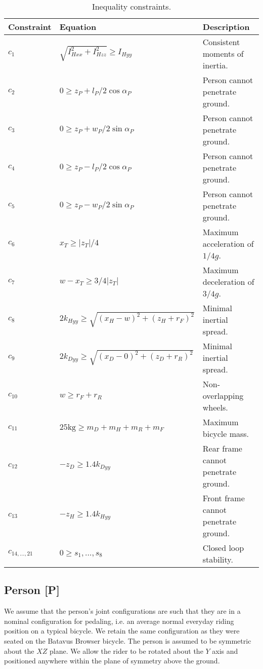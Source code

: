\documentclass{bmd2019p}
\begin{document}
\begin{table}
  \caption{Inequality constraints.}
  \label{tab:inequality-constraints}
  \centering
  \begin{tabular}{lll}
    \toprule
    Constraint & Equation & Description \\
    \midrule
    $c_1$    & $\sqrt{I_{Hxx}^2+I_{Hzz}^2} \geq I_{Hyy}$           & Consistent moments of inertia. \\
    $c_2$    & $0 \geq z_P + l_P/2 \cos{\alpha_P}$                 & Person cannot penetrate ground. \\
    $c_3$    & $0 \geq z_P + w_P/2 \sin{\alpha_P}$                 & Person cannot penetrate ground. \\
    $c_4$    & $0 \geq z_P - l_P/2 \cos{\alpha_P}$                 & Person cannot penetrate ground. \\
    $c_5$    & $0 \geq z_P - w_P/2 \sin{\alpha_P}$                 & Person cannot penetrate ground. \\
    $c_6$    & $x_T \geq |z_T|/4$                                  & Maximum acceleration of $1/4g$. \\
    $c_7$    & $w-x_T \geq 3/4|z_T|$                               & Maximum deceleration of $3/4g$. \\
    $c_8$    & $2k_{Hyy} \geq \sqrt{(x_H - w)^2 + (z_H + r_F)^2}$  & Minimal inertial spread. \\
    $c_9$    & $2k_{Dyy} \geq \sqrt{(x_D - 0)^2 + (z_D + r_R)^2}$  & Minimal inertial spread. \\
    $c_{10}$ & $w \geq r_F +r_R$                                   & Non-overlapping wheels. \\
    $c_{11}$ & $25\si{\kg} \geq m_D + m_H + m_R + m_F$             & Maximum bicycle mass. \\
    $c_{12}$ & $-z_D \geq 1.4 k_{Dyy}$                             & Rear frame cannot penetrate ground. \\
    $c_{13}$ & $-z_H \geq 1.4 k_{Hyy}$                             & Front frame cannot penetrate ground. \\
    $c_{14,\ldots,21}$ & $0 \geq s_1,\ldots,s_8$                   & Closed loop stability. \\
    \bottomrule
  \end{tabular}
\end{table}

\subsection{Person [P]}
%
We assume that the person's joint configurations are such that they are in a
nominal configuration for pedaling, i.e. an average normal everyday riding
position on a typical bicycle. We retain the same configuration as they were
seated on the Batavus Browser bicycle. The person is assumed to be symmetric
about the $XZ$ plane. We allow the rider to be rotated about the $Y$ axis and
positioned anywhere within the plane of symmetry above the ground.
\end{document}

